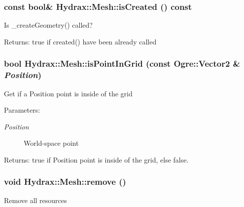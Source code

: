 \begin{CompactItemize}
{\subsubsection[{isCreated}]{\setlength{\rightskip}{0pt plus 5cm}const bool\& Hydrax::Mesh::isCreated () const}}
\label{class_hydrax_1_1_mesh_fb24883f62aa72204ed573693ff8bbf7}


Is \_\-createGeometry() called? \begin{Desc}
\item[Returns:]true if created() have been already called \end{Desc}
\hypertarget{class_hydrax_1_1_mesh_fc8ea18b26652bac0710ef6fcb4c5969}{
\subsubsection[{isPointInGrid}]{\setlength{\rightskip}{0pt plus 5cm}bool Hydrax::Mesh::isPointInGrid (const Ogre::Vector2 \& {\em Position})}}
\label{class_hydrax_1_1_mesh_fc8ea18b26652bac0710ef6fcb4c5969}


Get if a Position point is inside of the grid \begin{Desc}
\item[Parameters:]
\begin{description}
\item[{\em Position}]World-space point \end{description}
\end{Desc}
\begin{Desc}
\item[Returns:]true if Position point is inside of the grid, else false. \end{Desc}
\hypertarget{class_hydrax_1_1_mesh_5091867b361900642f5892e56661c790}{
\subsubsection[{remove}]{\setlength{\rightskip}{0pt plus 5cm}void Hydrax::Mesh::remove ()}}
\label{class_hydrax_1_1_mesh_5091867b361900642f5892e56661c790}


Remove all resources \hypertarget{class_hydrax_1_1_mesh_43b930f0d0e03f95799de998780727cc}{
}
\end{CompactItemize}
